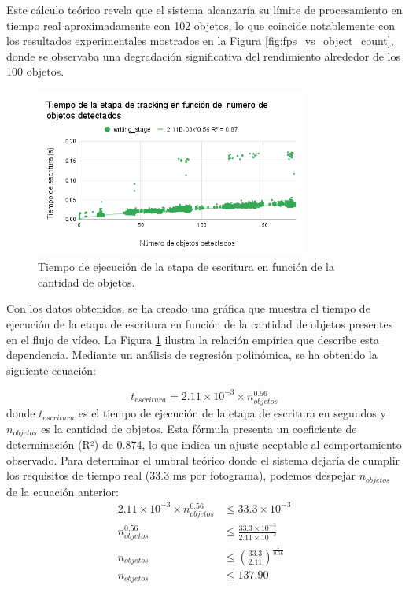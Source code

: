 \documentclass[11pt,spanish,listoffigures,listoftables]{tfgetsinf}
\begin{document}
Este cálculo teórico revela que el sistema alcanzaría su límite de procesamiento en tiempo real aproximadamente con 102 objetos, lo que coincide notablemente con los resultados experimentales mostrados en la Figura \ref{fig:fps_vs_object_count}, donde se observaba una degradación significativa del rendimiento alrededor de los 100 objetos.

\begin{figure}[H]
   \centering
   \includegraphics[width=0.8\textwidth]{images/analisis_de_la_solucion/cantidad_objetos/tiempo_etapa_escritura_cantidad_objetos.png}
   \caption[Tiempo de ejecución de la etapa de escritura en función de la cantidad de objetos]{Tiempo de ejecución de la etapa de escritura en función de la cantidad de objetos.}
   \label{fig:tiempo_etapa_escritura_cantidad_objetos}
\end{figure}

Con los datos obtenidos, se ha creado una gráfica que muestra el tiempo de ejecución de la etapa de escritura en función de la cantidad de objetos presentes en el flujo de vídeo. La Figura \ref{fig:tiempo_etapa_escritura_cantidad_objetos} ilustra la relación empírica que describe esta dependencia. Mediante un análisis de regresión polinómica, se ha obtenido la siguiente ecuación:

\begin{equation}
   t_{escritura} = 2.11 \times 10^{-3} \times n_{objetos}^{0.56}
\end{equation}
donde $t_{escritura}$ es el tiempo de ejecución de la etapa de escritura en segundos y $n_{objetos}$ es la cantidad de objetos. Esta fórmula presenta un coeficiente de determinación (R²) de 0.874, lo que indica un ajuste aceptable al comportamiento observado.
Para determinar el umbral teórico donde el sistema dejaría de cumplir los requisitos de tiempo real (33.3 ms por fotograma), podemos despejar $n_{objetos}$ de la ecuación anterior:
\begin{align}
   2.11 \times 10^{-3} \times n_{objetos}^{0.56} &\leq 33.3 \times 10^{-3} \\
   n_{objetos}^{0.56} &\leq \frac{33.3 \times 10^{-3}}{2.11 \times 10^{-3}} \\
   n_{objetos} &\leq \left(\frac{33.3}{2.11}\right)^{\frac{1}{0.56}} \\
   n_{objetos} &\leq 137.90
\end{align}
\end{document}
